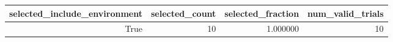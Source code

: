 \begin{tabular}{rrrr}
\toprule
selected_include_environment & selected_count & selected_fraction & num_valid_trials \\
\midrule
True & 10 & 1.000000 & 10 \\
\bottomrule
\end{tabular}
